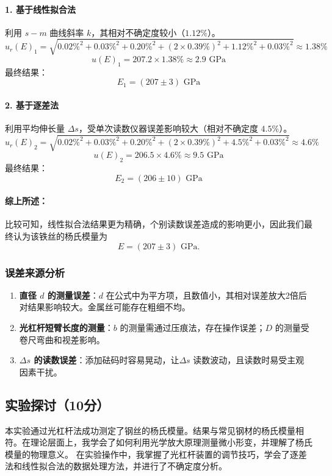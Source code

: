 \documentclass[]{../../templates/Report}%
\begin{document}
\begin{fullreportonly}
    \paragraph{1. 基于线性拟合法}
    利用 $s-m$ 曲线斜率 $k$，其相对不确定度较小（$1.12\%$）。
    \[ u_r(E)_1 = \sqrt{0.02\%^2 + 0.03\%^2 + 0.20\%^2 + (2\times 0.39\%)^2 + 1.12\%^2 + 0.03\%^2} \approx 1.38\% \]
    \[ u(E)_1 = 207.2 \times 1.38\% \approx 2.9 \text{ GPa} \]
    最终结果：
    $$\boxed{E_1 = (207 \pm 3) \text{ GPa}}$$

    \paragraph{2. 基于逐差法}
    利用平均伸长量 $\Delta s$，受单次读数仪器误差影响较大（相对不确定度 $4.5\%$）。
    \[ u_r(E)_2 = \sqrt{0.02\%^2 + 0.03\%^2 + 0.20\%^2 + (2\times 0.39\%)^2 + 4.5\%^2 + 0.03\%^2} \approx 4.6\% \]
    \[ u(E)_2 = 206.5 \times 4.6\% \approx 9.5 \text{ GPa} \]
    最终结果：
    $$\boxed{E_2 = (206 \pm 10) \text{ GPa}}$$

    \paragraph{综上所述：}比较可知，线性拟合法结果更为精确，个别读数误差造成的影响更小，因此我们最终认为该铁丝的杨氏模量为
    $$\boxed{E = (207 \pm 3) \text{ GPa}}.$$

    \subsubsection{误差来源分析}
    \begin{enumerate}
        \item \textbf{直径 $d$ 的测量误差}：$d$ 在公式中为平方项，且数值小，其相对误差放大2倍后对结果影响较大。金属丝可能存在粗细不均。
        \item \textbf{光杠杆短臂长度的测量}：$b$ 的测量需通过压痕法，存在操作误差；$D$ 的测量受卷尺弯曲和视差影响。
        \item \textbf{$\Delta s$ 的读数误差}：添加砝码时容易晃动，让$\Delta s$ 读数波动，且读数时易受主观因素干扰。
    \end{enumerate}

    \subsection{实验探讨（10分）}
    本实验通过光杠杆法成功测定了钢丝的杨氏模量。结果与常见钢材的杨氏模量相符。在理论层面上，我学会了如何利用光学放大原理测量微小形变，并理解了杨氏模量的物理意义。
    在实验操作中，我掌握了光杠杆装置的调节技巧，学会了逐差法和线性拟合法的数据处理方法，并进行了不确定度分析。


\end{fullreportonly}
\end{document}
